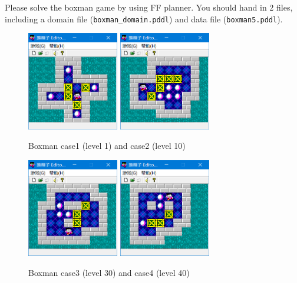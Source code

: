 \documentclass[a4paper, 11pt]{article}
\begin{document}
Please solve the boxman game by using FF planner. You should hand in 2 files, including a domain file (\texttt{boxman\_domain.pddl}) and  data file (\texttt{boxman5.pddl}).
\begin{figure}[htb]
  \centering
  \includegraphics[width=4cm]{Pic/case1}
  \qquad
  \includegraphics[width=4cm]{Pic/case2}
  \caption{Boxman case1 (level 1) and case2 (level 10)}
\end{figure}
\begin{figure}[htb]
  \centering
  \includegraphics[width=4cm]{Pic/case3}
  \qquad
  \includegraphics[width=4cm]{Pic/case4}
  \caption{Boxman case3 (level 30) and case4 (level 40)}
\end{figure}
\end{document}
